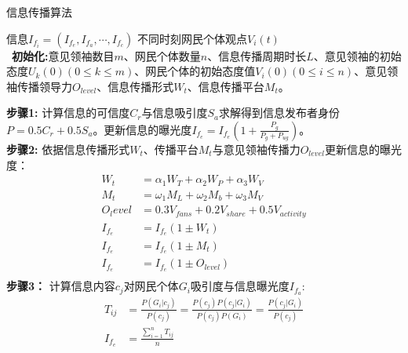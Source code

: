 \documentclass{ctexart}
\begin{document}
  
	\begin{algorithm}[H]
		\caption{信息传播算法}
		\label{alg1}
		\begin{algorithmic}[1]
			\Require 信息$I_{f_i}=(I_{f_e},I_{f_a},\cdots,I_{f_c})$
			\Ensure 不同时刻网民个体观点$V_i(t)$ \\ %
			
			\
            \textbf{初始化:}意见领袖数目$m$、网民个体数量$n$、信息传播周期时长$L$、意见领袖的初始态度$U_k(0)(0\leq k \leq m)$、网民个体的初始态度值$V_i(0)(0\leq i \leq n)$、意见领袖传播领导力$O_{level}$、信息传播形式$W_t$、信息传播平台$M_t$。
           
			
                \State \textbf{步骤1:} 计算信息的可信度$C_r$与信息吸引度$S_a$求解得到信息发布者身份$P = 0.5C_r + 0.5S_a $。更新信息的曝光度$I_{f_e}=I_{f_e}(1+\frac{P_g}{P_g+P_{ug}})$。\\
                \State \textbf{步骤2:} 依据信息传播形式$W_t$、传播平台$M_t$与意见领袖传播力$O_{level}$更新信息的曝光度：\\
                \begin{equation*}
                    \begin{aligned}
                        W_t &= \alpha_1W_T + \alpha_2W_P + \alpha_3W_V\\
                        M_t &= \omega_1 M_L + \omega_2M_b + \omega_3M_V\\
                        O_level &= 0.3V_{fans} + 0.2 V_{share} + 0.5V_{activity}\\
                        I_{f_e} &= I_{f_e}(1 \pm W_t)\\
                        I_{f_e} &= I_{f_e}(1 \pm M_t)\\
                        I_{f_e} &= I_{f_e}(1 \pm O_{level})\\
                    \end{aligned}
                \end{equation*}
                \State \textbf{步骤3：} 计算信息内容$c_j$对网民个体$G_i$吸引度与信息曝光度$I_{f_a}$:\\
                    \begin{equation*}
                        \begin{aligned}
                            T_{ij} &=\frac{P(G_i|c_j)}{P(c_j)} = \frac{P(c_j)P(c_j|G_i)}{P(c_j)P(G_i)}=\frac{P(c_j|G_i)}{P(c_j)} \\
                            I_{f_e} &= \frac{\sum\limits_{i=1}^nT_{ij}}{n}

\end{aligned}
\end{equation*}
\end{algorithmic}
\end{algorithm}
\end{document}

